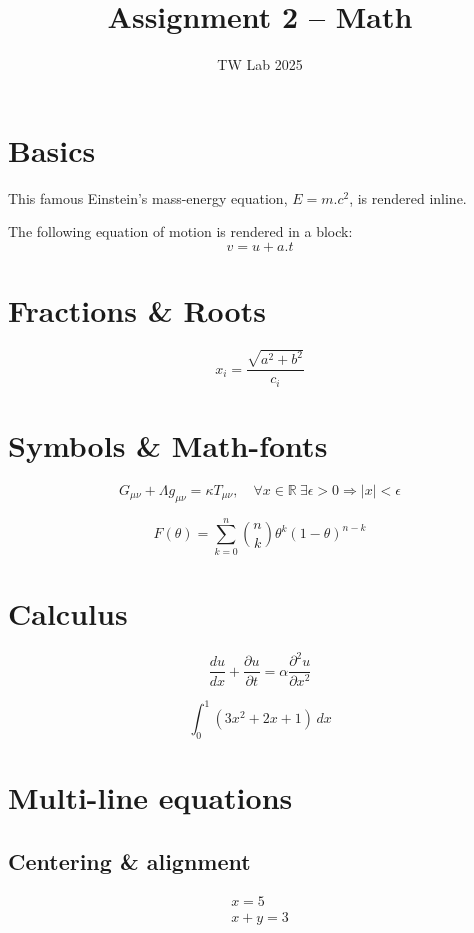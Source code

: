 \documentclass[12pt,a4paper]{article}
\title{Assignment 2 -- Math}
\author{TW Lab 2025}
\date{}
\begin{document}
\maketitle

\section{Basics}

This famous Einstein's mass-energy equation, \(E = m.c^2\), is rendered inline.

The following equation of motion is rendered in a block:
\[
v = u + a.t
\]

\section{Fractions \& Roots}

\[
x_i = \frac{\sqrt{a^2+b^2}}{c_i}
\]

\section{Symbols \& Math-fonts}

\[
G_{\mu\nu} + \Lambda g_{\mu\nu} = \kappa T_{\mu\nu},
\quad \forall x \in \mathbb{R}\ \exists \epsilon > 0
\Rightarrow |x| < \epsilon
\]

\[
F(\theta) = \sum_{k=0}^{n} \binom{n}{k}
\theta^k(1-\theta)^{n-k}
\]

\section{Calculus}

\[
\frac{du}{dx} + \frac{\partial u}{\partial t}
= \alpha \frac{\partial^2 u}{\partial x^2}
\]

\[
\int_0^1 (3x^2+2x+1)\,dx
\]

\section{Multi-line equations}

\subsection{Centering \& alignment}

\begin{gather}
x = 5 \\
x+y = 3
\end{gather}
\end{document}
